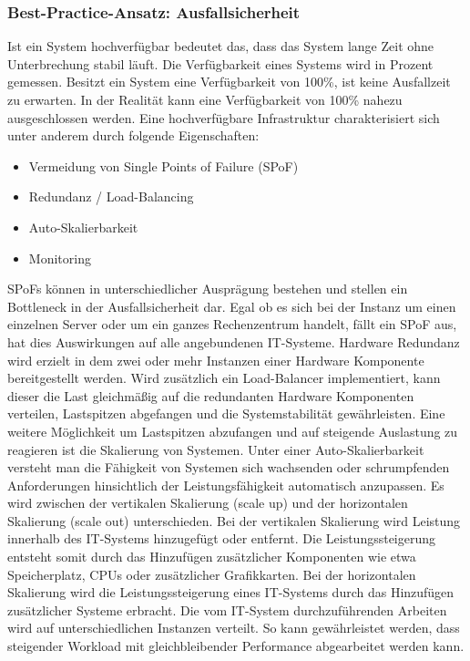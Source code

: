 \subsubsection{Best-Practice-Ansatz: Ausfallsicherheit}
Ist ein System \glqq{}hochverfügbar\grqq{} bedeutet das, dass das System lange Zeit ohne Unterbrechung stabil läuft. Die Verfügbarkeit eines Systems wird in Prozent gemessen. Besitzt ein System eine Verfügbarkeit von 100\%, ist keine Ausfallzeit zu erwarten. In der Realität kann eine Verfügbarkeit von 100\% nahezu ausgeschlossen werden. 
\bigbreak
Eine hochverfügbare Infrastruktur charakterisiert sich unter anderem durch folgende Eigenschaften:
\begin{itemize}
    \item Vermeidung von Single Points of Failure (SPoF)
    \item Redundanz / Load-Balancing
    \item Auto-Skalierbarkeit
    \item Monitoring
\end{itemize}
\bigbreak
SPoFs können in unterschiedlicher Ausprägung bestehen und stellen ein Bottleneck in der Ausfallsicherheit dar. Egal ob es sich bei der Instanz um einen einzelnen Server oder um ein ganzes Rechenzentrum handelt, fällt ein SPoF aus, hat dies Auswirkungen auf alle angebundenen IT-Systeme. 
\bigbreak
Hardware Redundanz wird erzielt in dem zwei oder mehr Instanzen einer Hardware Komponente bereitgestellt werden. Wird zusätzlich ein Load-Balancer implementiert, kann dieser die Last gleichmäßig auf die redundanten Hardware Komponenten verteilen, Lastspitzen abgefangen und die Systemstabilität gewährleisten. Eine weitere Möglichkeit um Lastspitzen abzufangen und auf steigende Auslastung zu reagieren ist die Skalierung von Systemen. Unter einer Auto-Skalierbarkeit versteht man die Fähigkeit von Systemen sich wachsenden oder schrumpfenden Anforderungen hinsichtlich der Leistungsfähigkeit automatisch anzupassen. Es wird zwischen der vertikalen Skalierung (scale up) und der horizontalen Skalierung (scale out) unterschieden. Bei der vertikalen Skalierung wird Leistung innerhalb des IT-Systems hinzugefügt oder entfernt. Die Leistungssteigerung entsteht somit durch das Hinzufügen zusätzlicher Komponenten wie etwa Speicherplatz, CPUs oder zusätzlicher Grafikkarten. Bei der horizontalen Skalierung wird die Leistungssteigerung eines IT-Systems durch das Hinzufügen zusätzlicher Systeme erbracht. Die vom IT-System durchzuführenden Arbeiten wird auf unterschiedlichen Instanzen verteilt. So kann gewährleistet werden, dass steigender Workload mit gleichbleibender Performance abgearbeitet werden kann. \autocite{geißler_2019}
